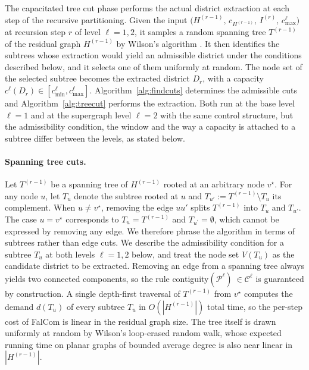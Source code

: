 \documentclass[11pt]{article}
\theoremstyle{definition}
\begin{document}
The capacitated tree cut phase performs the actual district extraction at
each step of the recursive partitioning. Given the input $(H^{(r-1)},\, c_{H^{(r-1)}},\, I^{(r)},\, c_{\max}^{\ell}\bigr)$ at recursion step $r$ of level $\ell=1,2$, it samples a random spanning tree $T^{(r-1)}$ of the residual graph $H^{(r-1)}$ by Wilson's algorithm \cite{wilson1996generating}. It then identifies the subtrees whose extraction would yield an admissible district under the conditions described below, and it selects one of them uniformly at random. The node set of the selected subtree becomes the extracted district $D_r$, with a capacity $c^{\ell}(D_r) \in [c^{\ell}_{\min}, c^{\ell}_{\max}]$. Algorithm~\ref{alg:findcuts} determines the admissible cuts and Algorithm~\ref{alg:treecut} performs the extraction. Both run at the base level $\ell=1$ and at the supergraph level $\ell=2$ with the same control structure, but the admissibility condition, the window and the way a capacity is attached to a subtree differ between the levels, as stated below.

\paragraph{Spanning tree cuts.} Let $T^{(r-1)}$ be a spanning tree of $H^{(r-1)}$ rooted at an arbitrary node $v^\star$. For any node $u$, let $T_u$ denote the subtree rooted at $u$ and $T_{u'} := T^{(r-1)} \setminus T_u$ its complement. When $u \neq v^\star$, removing the edge $uu'$ splits $T^{(r-1)}$ into $T_u$ and $T_{u'}$. The case $u=v^\star$ corresponds to $T_u = T^{(r-1)}$ and $T_{u^\prime} = \emptyset$, which cannot be expressed by removing any edge. We therefore phrase the algorithm in terms of subtrees rather than edge cuts. We describe the admissibility condition for a subtree $T_u$ at both levels $\ell=1,2$ below, and treat the node set $V(T_u)$ as the candidate district to be extracted. Removing an edge from a spanning tree always yields two connected components, so the rule contiguity$(\mathcal{P}^{\ell}) \ \in \mathcal{C}^{\ell}$ is guaranteed by construction. A single depth-first traversal of $T^{(r-1)}$ from $v^\star$ computes the demand $d(T_u)$ of every subtree $T_u$ in $O(|H^{(r-1)}|)$ total time, so the per-step cost of FalCom is linear in the residual graph size. The tree itself is drawn uniformly at random by Wilson's loop-erased random walk, whose expected running time on planar graphs of bounded average degree is also near linear in $|H^{(r-1)}|$.
\end{document}
